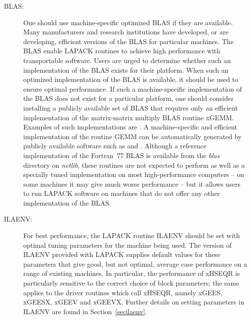\begin{description}
\item[BLAS:]
One should use machine-specific optimized BLAS if they are available.
Many manufacturers and research institutions have developed, or are
developing, efficient versions of the BLAS for particular machines.
The BLAS enable LAPACK routines to achieve high performance
with transportable software.  Users are urged to determine whether such an
implementation of the BLAS exists for their platform. When
such an optimized implementation of the BLAS is available, it
should be used to ensure
optimal performance.
If such a
machine-specific implementation of the BLAS does not exist for a particular
platform, one should consider installing a publicly available
set of BLAS that requires only an efficient implementation of the
matrix-matrix multiply BLAS routine xGEMM.  Examples of such
implementations are \cite{dayde94a,kagstrom95b}.  A machine-specific and
efficient implementation of the routine GEMM can be automatically
generated by publicly available software such as \cite{atlas_sc98} and
\cite{lawn111}.
Although a reference implementation of the Fortran~77 BLAS is available
from the {\em blas} directory on {\em netlib}, these routines are not
expected to
perform as well as a specially tuned implementation on most high-performance
computers -- on some machines it may give much worse performance
-- but it allows users to run LAPACK software on machines
that do not offer any other implementation of the BLAS.

\item[ILAENV:] For best performance, the LAPACK routine ILAENV
should be set with optimal tuning parameters for the machine being used.
The version of ILAENV provided with LAPACK supplies default values
for these parameters that give good, but not optimal, average
case performance on a range of existing machines.
In particular, the performance of xHSEQR is particularly sensitive to
the correct choice of block parameters; the same applies to the driver
routines which call xHSEQR, namely xGEES, xGEESX, xGEEV and xGEEVX.
Further details on setting parameters in ILAENV are found in
Section~\ref{secilaenv}.


\end{description}
